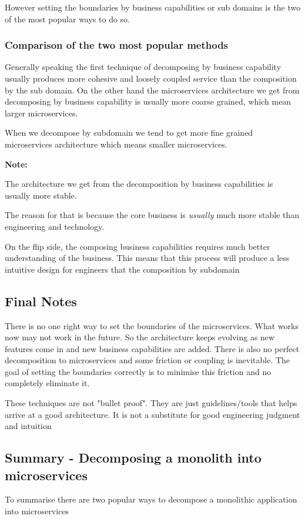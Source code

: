 \documentclass[a4paper, 11pt]{book}
\newenvironment{note}{
    \begin{siderule}
        \textbf{Note: }
        }{
    \end{siderule}}
\begin{document}
    However setting the boundaries by business capabilities or sub domains is the two of the most popular ways to do so.

    \subsubsection{Comparison of the two most popular methods}
    Generally speaking the first technique of decomposing by business capability usually produces more cohesive and loosely coupled service than the composition by the sub domain.
    On the other hand the microservices architecture we get from decomposing by business capability is usually more coarse grained, which mean larger microservices.

    When we decompose by subdomain we tend to get more fine grained microservices architecture which means smaller microservices.
    \begin{note}
        The architecture we get from the decomposition by business capabilities is usually more stable.
    \end{note}
    The reason for that is because the core business is \textit{usually} much more stable than engineering and technology.

    On the flip side, the composing business capabilities requires much better understanding of the business.
    This means that this process will produce a less intuitive design for engineers that the composition by subdomain

    \subsection{Final Notes}
    There is no one right way to set the boundaries of the microservices.
    What works now may not work in the future.
    So the architecture keeps evolving as new features come in and new business capabilities are added.
    There is also no perfect decomposition to microservices and some friction or coupling is inevitable.
    The goal of setting the boundaries correctly is to minimise this friction and no completely eliminate it.

    These techniques are not "bullet proof".
    They are just guidelines/tools that helps arrive at a good architecture.
    It is not a substitute for good engineering judgment and intuition

    \subsection{Summary - Decomposing a monolith into microservices}
    To summarise there are two popular ways to decompose a monolithic application into microservices
\end{document}
